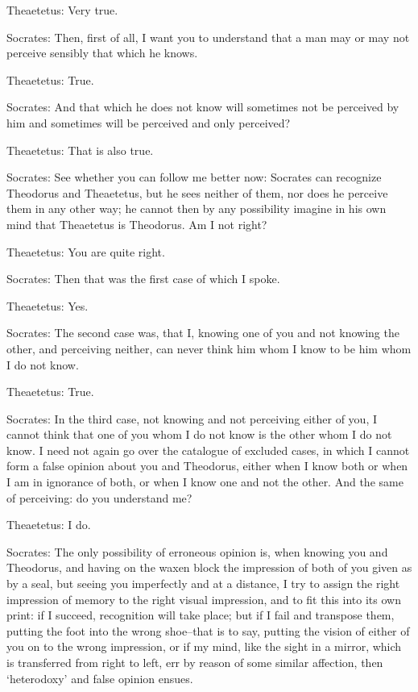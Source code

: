 Theaetetus: Very true.

Socrates: Then, first of all, I want you to understand that a man may or
may not perceive sensibly that which he knows.

Theaetetus: True.

Socrates: And that which he does not know will sometimes not be
perceived by him and sometimes will be perceived and only perceived?

Theaetetus: That is also true.

Socrates: See whether you can follow me better now: Socrates can
recognize Theodorus and Theaetetus, but he sees neither of them,
nor does he perceive them in any other way; he cannot then by any
possibility imagine in his own mind that Theaetetus is Theodorus. Am I
not right?

Theaetetus: You are quite right.

Socrates: Then that was the first case of which I spoke.

Theaetetus: Yes.

Socrates: The second case was, that I, knowing one of you and not
knowing the other, and perceiving neither, can never think him whom I
know to be him whom I do not know.

Theaetetus: True.

Socrates: In the third case, not knowing and not perceiving either of
you, I cannot think that one of you whom I do not know is the other whom
I do not know. I need not again go over the catalogue of excluded cases,
in which I cannot form a false opinion about you and Theodorus, either
when I know both or when I am in ignorance of both, or when I know one
and not the other. And the same of perceiving: do you understand me?

Theaetetus: I do.

Socrates: The only possibility of erroneous opinion is, when knowing you
and Theodorus, and having on the waxen block the impression of both of
you given as by a seal, but seeing you imperfectly and at a distance,
I try to assign the right impression of memory to the right visual
impression, and to fit this into its own print: if I succeed,
recognition will take place; but if I fail and transpose them, putting
the foot into the wrong shoe--that is to say, putting the vision of
either of you on to the wrong impression, or if my mind, like the sight
in a mirror, which is transferred from right to left, err by reason of
some similar affection, then `heterodoxy' and false opinion ensues.

